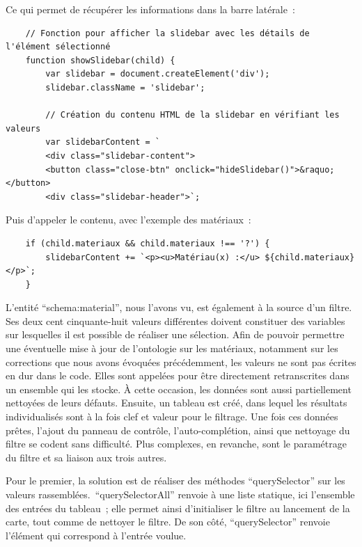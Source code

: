 Ce qui permet de récupérer les informations dans la barre latérale~:
\begin{lstlisting}
	// Fonction pour afficher la slidebar avec les détails de l'élément sélectionné
	function showSlidebar(child) {
		var slidebar = document.createElement('div');
		slidebar.className = 'slidebar';
		
		// Création du contenu HTML de la slidebar en vérifiant les valeurs
		var slidebarContent = `
		<div class="slidebar-content">
		<button class="close-btn" onclick="hideSlidebar()">&raquo;</button>
		<div class="slidebar-header">`;
\end{lstlisting}\par
Puis d’appeler le contenu, avec l’exemple des matériaux~:
\begin{lstlisting}
	if (child.materiaux && child.materiaux !== '?') {
		slidebarContent += `<p><u>Matériau(x) :</u> ${child.materiaux}</p>`;
	}
\end{lstlisting}\par
L’entité \enquote{schema:material}, nous l’avons vu, est également à la source d’un filtre. Ses deux cent cinquante-huit valeurs différentes doivent constituer des variables sur lesquelles il est possible de réaliser une sélection. Afin de pouvoir permettre une éventuelle mise à jour de l’ontologie sur les matériaux, notamment sur les corrections que nous avons évoquées précédemment, les valeurs ne sont pas écrites en dur dans le code. Elles sont appelées pour être directement retranscrites dans un ensemble qui les stocke. À cette occasion, les données sont aussi partiellement nettoyées de leurs défauts. Ensuite, un tableau est créé, dans lequel les résultats individualisés sont à la fois clef et valeur pour le filtrage. Une fois ces données prêtes, l’ajout du panneau de contrôle, l’auto-complétion, ainsi que nettoyage du filtre se codent sans difficulté. Plus complexes, en revanche, sont le paramétrage du filtre et sa liaison aux trois autres.\par
Pour le premier, la solution est de réaliser des méthodes \enquote{querySelector} sur les valeurs rassemblées. \enquote{querySelectorAll} renvoie à une liste statique, ici l’ensemble des entrées du tableau~; elle permet ainsi d’initialiser le filtre au lancement de la carte, tout comme de nettoyer le filtre. De son côté, \enquote{querySelector} renvoie l’élément qui correspond à l’entrée voulue.\par
